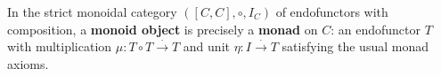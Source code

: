 In the strict monoidal category $([C, C], \circ, I_C)$ of endofunctors with composition, a \textbf{monoid object} is precisely a \textbf{monad} on $C$: an endofunctor $T$ with multiplication $\mu: T \circ T \xrightarrow{\cdot} T$ and unit $\eta: I \xrightarrow{\cdot} T$ satisfying the usual monad axioms.
